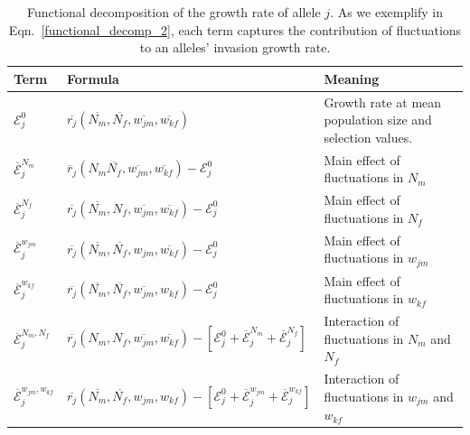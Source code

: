 \documentclass[12pt]{article}
\begin{document}
\begin{table}[h]
\fontsize{7}{12}\selectfont %
    \centering
      \caption{Functional decomposition of the growth rate of allele $j$. As we exemplify in Eqn.~\ref{functional_decomp_2}, each term captures the contribution of fluctuations to an alleles' invasion growth rate. }
  \resizebox{\textwidth}{!} {\begin{tabular}{l|l|l}
  \toprule
        Term & Formula & Meaning \\
        \hline
         $\mathcal{E}^{0}_{j}$ & $\overline{r_{j}} (\overline{N_{m}}, \overline{N_{f}}, \overline{w_{jm}}, \overline{w_{kf}})$ & Growth rate at mean population size and selection values. \\


         $\overline{\mathcal{E}}^{N_{m}}_{j}$ & $\overline{r}_{j}(N_{m} \overline{N_{f}}, \overline{w_{jm}}, \overline{w_{kf}}) - \mathcal{E}^{0}_{j} $ & Main effect of fluctuations in $N_{m}$\\

         $\overline{\mathcal{E}}^{N_{f}}_{j}$ & $ \overline{r_{j}}( \overline{N_{m}}, N_{f},\overline{w_{jm}}, \overline{w_{kf}}) - \mathcal{E}^{0}_{j}$ & Main effect of fluctuations in $N_{f}$ \\

        $\overline{\mathcal{E}}^{w_{jm}}_{j}$ & $ \overline{r_{j}}(\overline{N_{m}}, \overline{N_{f}}, w_{jm}, \overline{w_{kf}}) - \mathcal{E}^{0}_{j}$& Main effect of fluctuations in $w_{jm}$\\

        $\overline{\mathcal{E}}^{w_{kf}}_{j}$ & $ \overline{r_{j}}(\overline{N_{m}}, \overline{N_{f}}, \overline{w_{jm}}, w_{kf})- \mathcal{E}^{0}_{j}$ & Main effect of fluctuations in $w_{kf}$\\

        $\overline{\mathcal{E}}^{N_{m},N_{f}}_{j}$ & $ \overline{r_{j}}(N_{m}, N_{f}, \overline{w_{jm}}, \overline{w_{kf}})- [\mathcal{E}^{0}_{j} +\overline{\mathcal{E}}^{N_{m}}_{j}+\overline{\mathcal{E}}^{N_{f}}_{j}]$ & Interaction of fluctuations in $N_{m}$ and $N_{f}$\\

        $\overline{\mathcal{E}}^{w_{jm},w_{kf}}_{j}$ & $ \overline{r_{j}}(\overline{N_{m}}, \overline{N_{f}}, w_{jm}, w_{kf})- [\mathcal{E}^{0}_{j} +\overline{\mathcal{E}}^{w_{jm}}_j+\overline{\mathcal{E}}^{w_{kf}}_{j}]$ & Interaction of fluctuations in $w_{jm}$ and $w_{kf}$ \\


\end{tabular}}
\end{table}
\end{document}
